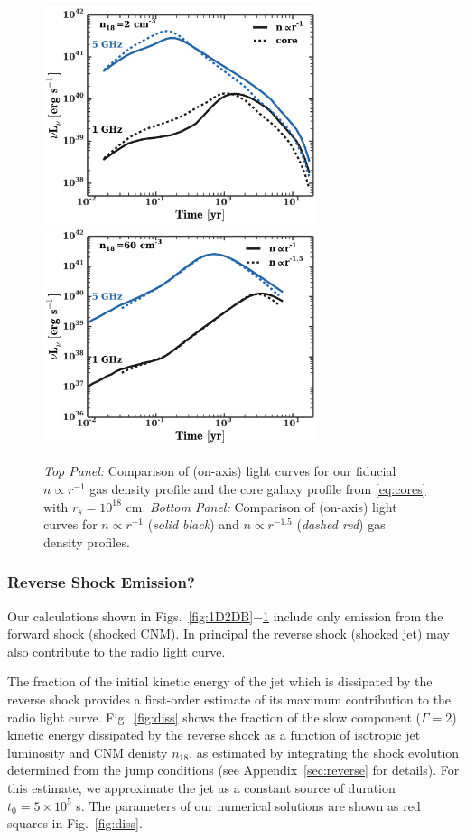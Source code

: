 \documentclass[usenatbib,fleqn]{mnras}
\begin{document}
\begin{figure} 
  \includegraphics[width=8cm]{fig_cores.pdf}
  \includegraphics[width=8cm]{profs2.pdf}
  \caption{\label{fig:cores} {\it Top Panel:} Comparison of (on-axis)
    light curves for our fiducial $n\propto r^{-1}$ gas density
    profile and the core galaxy profile from \eqref{eq:cores} with
    $r_s=10^{18}$ cm. {\it Bottom Panel:} Comparison of (on-axis)
    light curves for $n\propto r^{-1}$ ({\it solid black}) and
    $n\propto r^{-1.5}$ ({\it dashed red}) gas density profiles.}
\end{figure}


\subsubsection{Reverse Shock Emission?}
Our calculations shown in Figs.~\ref{fig:1D2DB}$-$\ref{fig:cores}
include only emission from the forward shock (shocked CNM).  In
principal the reverse shock (shocked jet) may also contribute to the
radio light curve.

The fraction of the initial kinetic energy of the jet which is
dissipated by the reverse shock provides a first-order estimate of its
maximum contribution to the radio light curve.  Fig.~\ref{fig:diss}
shows the fraction of the slow component ($\Gamma=2$) kinetic energy
dissipated by the reverse shock as a function of isotropic jet
luminosity and CNM denisty $n_{18}$, as estimated by integrating the
shock evolution determined from the jump conditions (see
Appendix~\ref{sec:reverse} for details).  For this estimate, we
approximate the jet as a constant source of duration $t_0 = 5 \times
10^{5}$ s.  The parameters of our numerical solutions are shown as red
squares in Fig.~\ref{fig:diss}.
\end{document}
